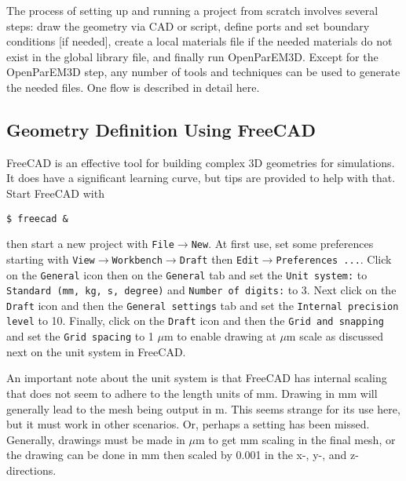 \documentclass[titlepage]{article}
\renewcommand\_{\textunderscore\linebreak[1]}
\begin{document}
The process of setting up and running a project from scratch involves several steps: draw the geometry via CAD or script, define ports and set boundary conditions [if needed], create a local materials file if the needed materials do not exist in the global library file, and finally run OpenParEM3D.  Except for the OpenParEM3D step, any number of tools and techniques can be used to generate the needed files.  One flow is described in detail here.

\subsection{Geometry Definition Using FreeCAD}
\label{sec:freecad}

FreeCAD is an effective tool for building complex 3D geometries for simulations.  It does have a significant learning curve, but tips are provided to help with that.  Start FreeCAD with
\begin{Verbatim}[fontsize=\small]
   $ freecad &
\end{Verbatim}
\noindent then start a new project with \texttt{File}$\rightarrow$\texttt{New}.
At first use, set some preferences starting with \newline \texttt{View}$\rightarrow$\texttt{Workbench}$\rightarrow$\texttt{Draft} then \texttt{Edit}$\rightarrow$\texttt{Preferences ...}.
Click on the \texttt{General} icon then on the \texttt{General} tab and set the \texttt{Unit system:} to \texttt{Standard (mm, kg, s, degree)} and \texttt{Number of digits:} to 3.
Next click on the \texttt{Draft} icon and then the \texttt{General settings} tab and set the \texttt{Internal precision level} to 10. Finally, click on the \texttt{Draft} icon and then the \texttt{Grid and snapping} and set the \texttt{Grid spacing} to 1 $\mu$m to enable drawing at $\mu$m scale as discussed next on the unit system in FreeCAD.

An important note about the unit system is that FreeCAD has internal scaling that does not seem to adhere to the length units of mm.  Drawing in mm will generally lead to the mesh being output in m.  This seems strange for its use here, but it must work in other scenarios.  Or, perhaps a setting has been missed.  Generally, drawings must be made in $\mu$m to get mm scaling in the final mesh, or the drawing can be done in mm then scaled by 0.001 in the x-, y-, and z- directions.
\end{document}
